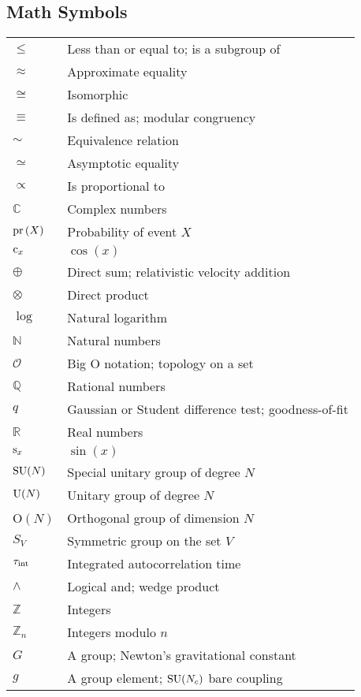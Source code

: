 \documentclass[12pt]{book}
\theoremstyle{definition}
\newenvironment{frontstuff}
  {\centering\chapter*{}}
  {\clearpage}
\begin{document}
\begin{frontstuff}
\section*{Math Symbols}
\begin{tabular}{ll}
$\leq$          & Less than or equal to; is a subgroup of\\
$\approx$       & Approximate equality \\
$\cong$         & Isomorphic\\
$\equiv$        & Is defined as; modular congruency \\
$\sim$          & Equivalence relation \\
$\simeq$        & Asymptotic equality \\
$\propto$       & Is proportional to \\
$\mathbb{C}$    & Complex numbers \\
$\operatorname{pr}\left(X\right)$        & Probability of event $X$ \\
$\operatorname{c}_x$         & $\cos(x)$ \\
$\oplus$        & Direct sum; relativistic velocity addition  \\
$\otimes$       & Direct product \\ 
$\log$          & Natural logarithm \\
$\mathbb{N}$    & Natural numbers \\
$\mathcal{O}$   & Big O notation; topology on a set \\ 
$\mathbb{Q}$    & Rational numbers \\
$q$             & Gaussian or Student difference test; goodness-of-fit \\
$\mathbb{R}$    & Real numbers \\
$\operatorname{s}_x$          & $\sin(x)$ \\
$\operatorname{SU}(N)$        & Special unitary group of degree $N$ \\
$\operatorname{U}(N)$         & Unitary group of degree $N$ \\
O$(N)$          & Orthogonal group of dimension $N$ \\
$S_V$           & Symmetric group on the set $V$ \\
$\tau_\text{int}$       & Integrated autocorrelation time \\
$\wedge$        & Logical and; wedge product \\
$\mathbb{Z}$    & Integers \\
$\mathbb{Z}_n$  & Integers modulo $n$ \\
$G$             & A group; Newton's gravitational constant\\
$g$             & A group element; $\operatorname{SU}(N_c)$ bare coupling\\
\end{tabular}
\clearpage



\end{frontstuff}
\end{document}
